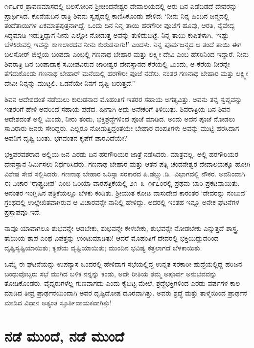 ೧೯೬೯ರ ಶ್ರಾವಣಮಾಸದಲ್ಲಿ ಬಲಸೋರಿನ ಶ‍್ರೀಚಂದನೇಶ್ವರ ದೇವಾಲಯದಲ್ಲಿ ಆರು ದಿನ ಎಡೆಬಿಡದೆ ದೇವರನ್ನು ಪ್ರಾರ್ಥಿಸಿದ. ಕೊನೆಯದಿನ ರಾತ್ರಿ ಶಿವನು ಸ್ವಪ್ನದಲ್ಲಿ ಕಾಣಿಸಿಕೊಂಡು ಹೇಳಿದ: ‘ನೀನು ನಿನ್ನ ಹಿಂದಿನ ಜನ್ಮದಲ್ಲಿ ತಂದೆತಾಯಿಗಳ ಏಕಮಾತ್ರಪುತ್ರನಾಗಿದ್ದೆ. ಒಂದು ದಿನ ನಿನ್ನ ತಾಯಿ ಹರಗೌರೀ ಪೂಜೆಗೆ ಹೂವು, ಆರತಿ, ನೈವೇದ್ಯ ಸಿದ್ಧಮಾಡಿ ಇಡುತ್ತಿದ್ದಾಗ ನೀನು ಎಲ್ಲೋ ನೋಡುತ್ತ ಅವನ್ನು ತುಳಿದುಬಿಟ್ಟೆ. ನಿನ್ನ ತಾಯಿ ಕುಪಿತಳಾಗಿ, ‘ಇಷ್ಟು ಬೆಳಕಿರುವಲ್ಲಿ ಇವನ್ನು ಕಾಣಲಾರದವ ನೀನು ಕುರುಡನಾಗು!’ ಎಂದಳು. ನಿನ್ನ ಪೂರ್ವಜನ್ಮದ ಆ ತಂದೆ ತಾಯಿ ಈಗ ಬಲಸೋರ್ ಜಿಲ್ಲೆಯ ಬಂಪದಾ ಎಂಬಲ್ಲಿ ಗಣನಾಥ ಬೇಹಾರ ಮತ್ತು ಲಕ್ಷ್ಮೀ ದೇವಿ ಎಂಬ ಹೆಸರಿನಿಂದ ಇದ್ದಾರೆ. ನೀನು ಶಿವರಾತ್ರಿ ದಿನ ಬಂಪಾದಾಕ್ಕೆ ಸಮೀಪವಿರುವ ಜಾರೀಶ್ವರ ದೇವಸ್ಥಾನದ ಕೆರೆಯಲ್ಲಿ ಮಿಂದು, ಆ ಕೆರೆಯ ನೀರನ್ನೇ ತೆಗೆದುಕೊಂಡು ಗಣನಾಥ ಬೇಹಾರ್ ಮನೆಯಲ್ಲಿ ಹರಗೌರೀ ಪೂಜೆ ನಡೆಸು. ನಂತರ ಗಣನಾಥ ಬೇಹಾರ ಮತ್ತು ಲಕ್ಷ್ಮೀ ದೇವೀ ನಿನ್ನನ್ನು ಮುಟ್ಟಲಿ. ಒಡನೆಯೇ ನಿನಗೆ ದೃಷ್ಟಿ ಬರುತ್ತದೆ.”

ಶಿವನ ಆದೇಶದಂತೆ ನಡೆಯಲು ಕುರುಡನಾದ ಮೊಹಂತಿಗೆ ಇತರರ ಸಹಾಯ ಅಗತ್ಯವಿತ್ತು. ಅವನು ತನ್ನ ಸ್ವಪ್ನವನ್ನು ಇತರರಿಗೆ ಹೇಳಿ ಅವರಿಂದ ಸಹಾಯ ಪಡೆದ. ಹೀಗಾಗಿ ಅದು ಅನೇಕರಿಗೆ ತಿಳಿಯಿತು. ಶಿವರಾತ್ರಿಯ ದಿನ ಶಿವನ ಆದೇಶದಂತೆ ಅಲ್ಲಿ ಮಿಂದು, ನೀರು ತಂದು, ಭಕ್ತಿಶ್ರದ್ಧೆಗಳಿಂದ ಪೂಜೆ ಮಾಡಿದ. ಅಂದು ಅವನ ಪೂಜೆ ನೋಡಲು ಸಾವಿರಾರು ಜನರು ಸೇರಿದ್ದರು. ಎಲ್ಲರೂ ನೋಡುತ್ತಿದ್ದಂತೆಯೇ ಬೇಹಾರ ದಂಪತಿಗಳು ಅವನ್ನು ಮುಟ್ಟಿ ಹರಸಿದಾಗ ಅವನಿಗೆ ದೃಷ್ಟಿ ಬಂತು. ಭಗವಂತನ ಕೃಪೆಗೆ ಪಾರವಿದೆಯೇ?

ಭಕ್ತಿಪರವಶರಾದ ಅಲ್ಲಿಯ ಜನ ಎರಡು ದಿನ ಹರಗೌರಿಯರ ಜಾತ್ರೆ ನಡೆಸಿದರು. ಮಾತ್ರವಲ್ಲ, ಅಲ್ಲಿ ಹರಗೌರಿಯರ ದೇವಸ್ಥಾನ ನಿರ್ಮಿಸಲು ನಿರ್ಧರಿಸಿದರು. ಗಣನಾಥ ಬೇಹಾರ ಮತ್ತು ಆತನ ಪತ್ನಿ ಚಂದನೇಶ್ವರ ದೇವಾಲಯಕ್ಕೂ ಹೋಗಿ ವಿಶೇಷ ಸೇವೆ ಸಲ್ಲಿಸಿದರು. ಗಣನಾಥ ಬೇಹಾರ ಒರಿಸ್ಸಾ ಸರಕಾರದ ಪಿ.ಡಬ್ಲ್ಯು.ಡಿ.\ ವಿಭಾಗದಲ್ಲಿ ನೌಕರ. ಅವನಿಂದಾಗಿ ಈ ವಿಚಾರ ‘ರಾಷ್ಟ್ರದೀಪ’ ಎಂಬ ಒರಿಯಾ ವಾರಪತ್ರಿಕೆಯಲ್ಲಿ ೨೧–೩–೧೯೭೦ರಲ್ಲಿ ಪ್ರಥಮ ಬಾರಿ ಪ್ರಕಟ\-ವಾಯಿತು. ಅನಂತರ ಇಂಗ್ಲಿಷಿನ  ಪತ್ರಿಕೆಯಲ್ಲೂ ಬೆಳಕು ಕಂಡಿತು. ಶ‍್ರೀಯುತ ಕೋಟ ವಾಸುದೇವ ಕಾರಂತರ ‘ದೇವರನ್ನು ನಂಬುವ’ ಗ್ರಂಥದಲ್ಲಿ ಉಲ್ಲೇಖಿತವಾಗಿರುವ ಆ ವಿಚಾರವನ್ನೇ ನಾನಿಲ್ಲಿ ಹೇಳಿದ್ದು. ಅದರಲ್ಲಿ ಇಂತಹ ಇನ್ನೂ ಅನೇಕ ಘಟನೆಗಳ ಪ್ರಸ್ತಾಪವೂ ಇದೆ.

ನಾವೂ ಯಾವಾಗಲೂ ಶುಭವನ್ನೇ ಆಡಬೇಕು, ಶುಭವನ್ನೇ ಕೇಳಬೇಕು, ಶುಭವನ್ನೇ ನೋಡಬೇಕು ಎನ್ನುತ್ತದೆ ಶಾಸ್ತ್ರ. ತಾಯಿಯ ಶಾಪ ಎಂಥ ವಿಪತ್ತನ್ನು ಉಂಟುಮಾಡಿತು! ಆದರೆ ಮೊಹಂತಿಗೆ ದೇವರಲ್ಲಿ ಭಕ್ತಿಯಿದ್ದುದರಿಂದ ದೃಷ್ಟಿಸೃಷ್ಟಿಯಾಯಿತು; ಕೃಪೆಯ ವೃಷ್ಟಿಯಾಯಿತು; ಮುಂದಿನ ಭವಿಷ್ಯ ಕತ್ತಲಾಗದೆ ಬೆಳಕಾಯಿತು.

ಒಮ್ಮೆ ಈ ಘಟನೆಯನ್ನು ಉಪನ್ಯಾಸ ಒಂದರಲ್ಲಿ ಹೇಳಿದಾಗ ಸಭೆಯಲ್ಲಿದ್ದ ಉನ್ನತ ಸರಕಾರೀ ಹುದ್ದೆಯಲ್ಲಿದ್ದ ಹರಿಜನ ಬಂಧುವೊಬ್ಬರು ಸಭೆ ಮುಗಿದ ಬಳಿಕ ನನ್ನನ್ನು ಕಂಡು, ಅದೇ ರೀತಿಯ ತಮ್ಮ ಅಪೂರ್ವ ಅನುಭವವನ್ನು ತೋಡಿಕೊಂಡರು. ವೈದ್ಯರುಗಳೆಲ್ಲ ಗುಣವಾಗದು ಎಂದು ಕೈಬಿಟ್ಟ ಮೇಲೆ, ಶ್ರದ್ಧೆಭಕ್ತಿಗಳಿಂದ ಎರಡು ವರ್ಷಗಳ ಕಾಲ ಮಾಡಿದ ತೀವ್ರ ಪ್ರಾರ್ಥನೆಯಿಂದಾಗಿ ಅವರ ದೃಷ್ಟಿದೋಷ ದೂರವಾಗಿತ್ತು. ಅವರು ಶ್ರದ್ಧೆ ಮತ್ತು ತಾಳ್ಮೆಯಿಂದ ಪ್ರಾರ್ಥನೆ ಮಾಡಿದ ವಿಧಾನ ಅತ್ಯಂತ ಸ್ಫೂರ್ತಿದಾಯಕವಾಗಿತ್ತು!


\section*{ನಡೆ ಮುಂದೆ, ನಡೆ ಮುಂದೆ}

